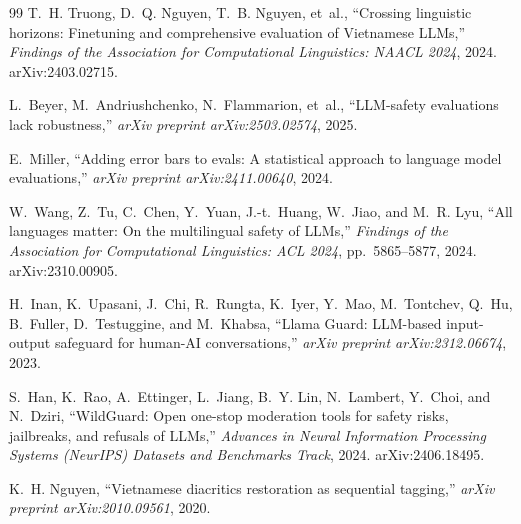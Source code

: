 \documentclass[11pt]{article}
\begin{document}
\begin{thebibliography}{99}
T.~H. Truong, D.~Q. Nguyen, T.~B. Nguyen, et~al.,
``Crossing linguistic horizons: Finetuning and comprehensive evaluation of {Vietnamese} {LLMs},''
\textit{Findings of the Association for Computational Linguistics: NAACL 2024}, 2024. arXiv:2403.02715.

L.~Beyer, M.~Andriushchenko, N.~Flammarion, et~al.,
``{LLM}-safety evaluations lack robustness,''
\textit{arXiv preprint arXiv:2503.02574}, 2025.

E.~Miller,
``Adding error bars to evals: A statistical approach to language model evaluations,''
\textit{arXiv preprint arXiv:2411.00640}, 2024.

W.~Wang, Z.~Tu, C.~Chen, Y.~Yuan, J.-t.~Huang, W.~Jiao, and M.~R. Lyu,
``All languages matter: On the multilingual safety of {LLMs},''
\textit{Findings of the Association for Computational Linguistics: ACL 2024}, pp.~5865--5877, 2024. arXiv:2310.00905.

H.~Inan, K.~Upasani, J.~Chi, R.~Rungta, K.~Iyer, Y.~Mao, M.~Tontchev, Q.~Hu, B.~Fuller, D.~Testuggine, and M.~Khabsa,
``{Llama Guard}: {LLM}-based input-output safeguard for human-{AI} conversations,''
\textit{arXiv preprint arXiv:2312.06674}, 2023.

S.~Han, K.~Rao, A.~Ettinger, L.~Jiang, B.~Y. Lin, N.~Lambert, Y.~Choi, and N.~Dziri,
``{WildGuard}: Open one-stop moderation tools for safety risks, jailbreaks, and refusals of {LLMs},''
\textit{Advances in Neural Information Processing Systems (NeurIPS) Datasets and Benchmarks Track}, 2024. arXiv:2406.18495.

K.~H. Nguyen,
``Vietnamese diacritics restoration as sequential tagging,''
\textit{arXiv preprint arXiv:2010.09561}, 2020.

\end{thebibliography}
\end{document}
